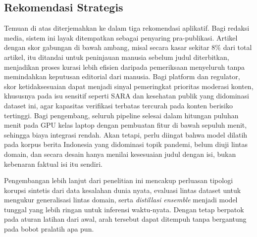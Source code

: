 \subsection{Rekomendasi Strategis}
Temuan di atas diterjemahkan ke dalam tiga rekomendasi aplikatif. Bagi redaksi media, sistem ini layak ditempatkan sebagai penyaring pra-publikasi. Artikel dengan skor gabungan di bawah ambang, misal secara kasar sekitar 8\% dari total artikel, itu ditandai untuk peninjauan manusia sebelum judul diterbitkan, menjadikan proses kurasi lebih efisien daripada pemeriksaan menyeluruh tanpa memindahkan keputusan editorial dari manusia. Bagi platform dan regulator, skor ketidaksesuaian dapat menjadi sinyal pemeringkat prioritas moderasi konten, khususnya pada isu sensitif seperti SARA dan kesehatan publik yang didominasi dataset ini, agar kapasitas verifikasi terbatas tercurah pada konten berisiko tertinggi. Bagi pengembang, seluruh pipeline selesai dalam hitungan puluhan menit pada GPU kelas laptop dengan pembuatan fitur di bawah sepuluh menit, sehingga biaya integrasi rendah.  Akan tetapi, perlu diingat bahwa model dilatih pada korpus berita Indonesia yang didominasi topik pandemi, belum diuji lintas domain, dan secara desain hanya menilai kesesuaian judul dengan isi,  bukan kebenaran faktual isi itu sendiri.

Pengembangan lebih lanjut dari penelitian ini mencakup perluasan tipologi korupsi sintetis dari data kesalahan dunia nyata, evaluasi lintas dataset untuk mengukur generalisasi lintas domain, serta \textit{distillasi ensemble} menjadi model tunggal yang lebih ringan untuk inferensi waktu-nyata. Dengan tetap berpatok pada aturan latihan dari awal, arah tersebut dapat ditempuh tanpa bergantung pada bobot pralatih apa pun.
